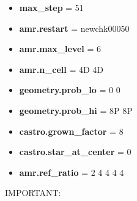 \begin{itemize}

\item {\bf max\_step}      = 51

\item {\bf amr.restart} = newchk00050

\item {\bf amr.max\_level} = 6

\item {\bf amr.n\_cell}    = 4D 4D

\item {\bf geometry.prob\_lo} =  0  0

\item {\bf geometry.prob\_hi} = 8P 8P

\item {\bf castro.grown\_factor} = 8

\item {\bf castro.star\_at\_center} = 0

\item {\bf amr.ref\_ratio}    = 2 4 4 4 4

\end{itemize}

IMPORTANT:

